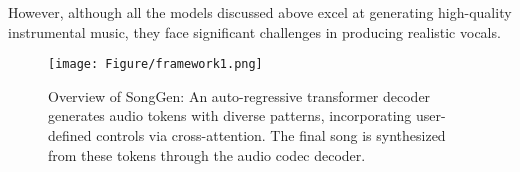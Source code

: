 However, although all the models discussed above excel at generating high-quality instrumental music, they face significant challenges in producing realistic vocals.



\begin{figure*}[tb!]
	\centering
	\texttt{[image: Figure/framework1.png]}
    \vspace{-10pt}
	\caption{Overview of SongGen: An auto-regressive transformer decoder generates audio tokens with diverse patterns, incorporating user-defined controls via cross-attention. The final song is synthesized from these tokens through the audio codec decoder.
    }
	\label{fig:framework}
    \vspace{-10pt}
\end{figure*}


